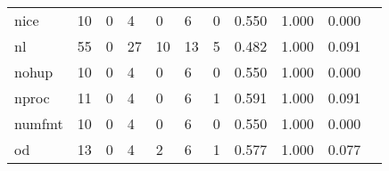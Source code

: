 \begin{longtable}{lp{1.2cm}p{1.2cm}p{1.2cm}p{1.2cm}p{1.2cm}p{1.2cm}p{1.2cm}p{1.2cm}p{1.2cm}p{1.2cm}}
nice      &                                    10 &                                                  0 &                                                  4 &                                                  0 &                                                  6 &                                                  0 &                                         0.550 &                                              1.000 &                                              0.000 \\
nl        &                                    55 &                                                  0 &                                                 27 &                                                 10 &                                                 13 &                                                  5 &                                         0.482 &                                              1.000 &                                              0.091 \\
nohup     &                                    10 &                                                  0 &                                                  4 &                                                  0 &                                                  6 &                                                  0 &                                         0.550 &                                              1.000 &                                              0.000 \\
nproc     &                                    11 &                                                  0 &                                                  4 &                                                  0 &                                                  6 &                                                  1 &                                         0.591 &                                              1.000 &                                              0.091 \\
numfmt    &                                    10 &                                                  0 &                                                  4 &                                                  0 &                                                  6 &                                                  0 &                                         0.550 &                                              1.000 &                                              0.000 \\
od        &                                    13 &                                                  0 &                                                  4 &                                                  2 &                                                  6 &                                                  1 &                                         0.577 &                                              1.000 &                                              0.077 \\

\end{longtable}
